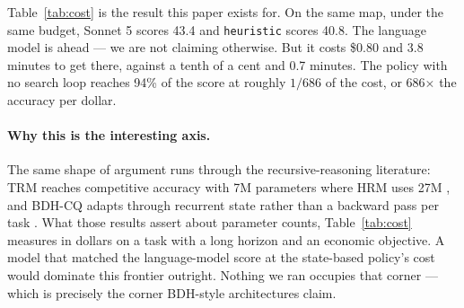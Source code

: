 Table~\ref{tab:cost} is the result this paper exists for. On the same map, under the same budget, Sonnet 5 scores 43.4 and \texttt{heuristic} scores 40.8. The language model is ahead --- we are not claiming otherwise. But it costs \$0.80 and 3.8 minutes to get there, against a tenth of a cent and 0.7 minutes. The policy with no search loop reaches 94\% of the score at roughly $1/686$ of the cost, or 686$\times$ the accuracy per dollar.

\paragraph{Why this is the interesting axis.} The same shape of argument runs through the recursive-reasoning literature: TRM reaches competitive accuracy with 7M parameters where HRM uses 27M \citep{jolicoeurmartineau2025trm,wang2025hrm}, and BDH-CQ adapts through recurrent state rather than a backward pass per task \citep{engdahl2026bdhcq}. What those results assert about parameter counts, Table~\ref{tab:cost} measures in dollars on a task with a long horizon and an economic objective. A model that matched the language-model score at the state-based policy's cost would dominate this frontier outright. Nothing we ran occupies that corner --- which is precisely the corner BDH-style architectures claim.

